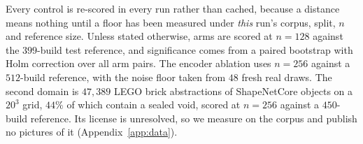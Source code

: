 Every control is re-scored in every run rather than cached, because a distance means
nothing until a floor has been measured under \emph{this} run's corpus, split, $n$ and
reference size.  Unless stated otherwise,
arms are scored at $n{=}128$ against the $399$-build test reference, and significance comes
from a paired bootstrap with Holm correction \citep{holm1979simple} over all arm pairs. The
encoder ablation uses $n{=}256$ against a $512$-build reference, with the noise floor taken
from $48$ fresh real draws. The second domain is $47{,}389$ LEGO brick abstractions of
ShapeNetCore objects on a $20^3$ grid, $44\%$ of which contain a sealed void, scored at
$n{=}256$ against a $450$-build reference. Its license is unresolved, so we measure on the
corpus and publish no pictures of it (Appendix~\ref{app:data}).
